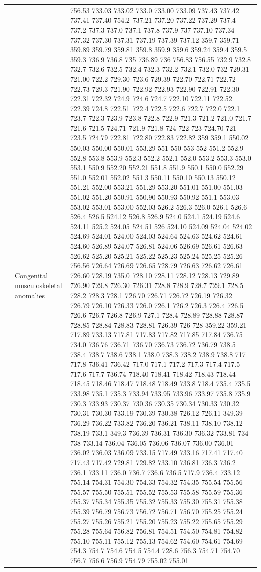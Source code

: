 \documentclass[3p,super,numbers,sort&compress,preprint,10pt]{elsarticle}
\begin{document}
\begin{longtable}{|L{.1in}|L{.6in}||L{5.65in}|}
    & Congenital musculoskeletal anomalies &  756.53 733.03 733.02 733.0 733.00 733.09 737.43 737.42 737.41 737.40 754.2 737.21 737.20 737.22 737.29 737.4 737.2 737.3 737.0 737.1 737.8 737.9 737 737.10 737.34 737.32 737.30 737.31 737.19 737.39 737.12 359.7 359.71 359.89 359.79 359.81 359.8 359.9 359.6 359.24 359.4 359.5 359.3 736.9 736.8 735 736.89 736 756.83 756.55 732.9 732.8 732.7 732.6 732.5 732.4 732.3 732.2 732.1 732.0 732 729.31 721.00 722.2 729.30 723.6 729.39 722.70 722.71 722.72 722.73 729.3 721.90 722.92 722.93 722.90 722.91 722.30 722.31 722.32 724.9 724.6 724.7 722.10 722.11 722.52 722.39 724.8 722.51 722.4 722.5 722.6 722.7 722.0 722.1 723.7 722.3 723.9 723.8 722.8 722.9 721.3 721.2 721.0 721.7 721.6 721.5 724.71 721.9 721.8 724 722 723 724.70 721 723.5 724.79 722.81 722.80 722.83 722.82 359 359.1 550.02 550.03 550.00 550.01 553.29 551 550 553 552 551.2 552.9 552.8 553.8 553.9 552.3 552.2 552.1 552.0 553.2 553.3 553.0 553.1 550.9 552.20 552.21 551.8 551.9 550.1 550.0 552.29 551.0 552.01 552.02 551.3 550.11 550.10 550.13 550.12 551.21 552.00 553.21 551.29 553.20 551.01 551.00 551.03 551.02 551.20 550.91 550.90 550.93 550.92 551.1 553.03 553.02 553.01 553.00 552.03 526.2 526.3 526.0 526.1 526.6 526.4 526.5 524.12 526.8 526.9 524.0 524.1 524.19 524.6 524.11 525.2 524.05 524.51 526 524.10 524.09 524.04 524.02 524.69 524.01 524.00 524.03 524.64 524.63 524.62 524.61 524.60 526.89 524.07 526.81 524.06 526.69 526.61 526.63 526.62 525.20 525.21 525.22 525.23 525.24 525.25 525.26 756.56 726.64 726.69 726.65 728.79 726.63 726.62 726.61 726.60 728.19 735.0 728.10 728.11 728.12 728.13 729.89 726.90 729.8 726.30 726.31 728.8 728.9 728.7 729.1 728.5 728.2 728.3 728.1 726.70 726.71 726.72 726.19 726.32 726.79 726.10 726.33 726.0 726.1 726.2 726.3 726.4 726.5 726.6 726.7 726.8 726.9 727.1 728.4 728.89 728.88 728.87 728.85 728.84 728.83 728.81 726.39 726 728 359.22 359.21 717.89 733.13 717.81 717.83 717.82 717.85 717.84 736.75 734.0 736.76 736.71 736.70 736.73 736.72 736.79 738.5 738.4 738.7 738.6 738.1 738.0 738.3 738.2 738.9 738.8 717 717.8 736.41 736.42 717.0 717.1 717.2 717.3 717.4 717.5 717.6 717.7 736.74 718.40 718.41 718.42 718.43 718.44 718.45 718.46 718.47 718.48 718.49 733.8 718.4 735.4 735.5 733.98 735.1 735.3 733.94 733.95 733.96 733.97 735.8 735.9 730.3 733.93 730.37 730.36 730.35 730.34 730.33 730.32 730.31 730.30 733.19 730.39 730.38 726.12 726.11 349.39 736.29 736.22 733.82 736.20 736.21 738.11 738.10 738.12 738.19 733.1 349.3 736.39 736.31 736.30 736.32 733.81 734 738 733.14 736.04 736.05 736.06 736.07 736.00 736.01 736.02 736.03 736.09 733.15 717.49 733.16 717.41 717.40 717.43 717.42 729.81 729.82 733.10 736.81 736.3 736.2 736.1 733.11 736.0 736.7 736.6 736.5 717.9 736.4 733.12 755.14 754.31 754.30 754.33 754.32 754.35 755.54 755.56 755.57 755.50 755.51 755.52 755.53 755.58 755.59 755.36 755.37 755.34 755.35 755.32 755.33 755.30 755.31 755.38 755.39 756.79 756.73 756.72 756.71 756.70 755.25 755.24 755.27 755.26 755.21 755.20 755.23 755.22 755.65 755.29 755.28 755.64 756.82 756.81 754.51 754.50 754.81 754.82 755.10 755.11 755.12 755.13 754.62 754.60 754.61 754.69 754.3 754.7 754.6 754.5 754.4 728.6 756.3 754.71 754.70 756.7 756.6 756.9 754.79 755.02 755.01 
\end{longtable}
\end{document}
